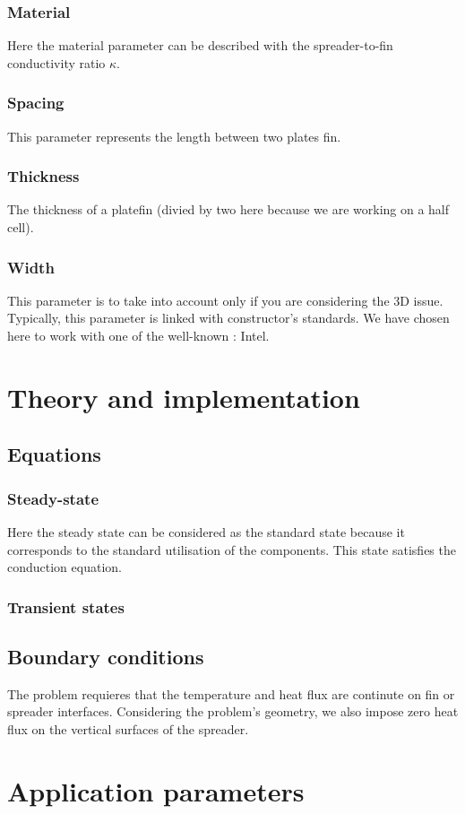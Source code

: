 \subsubsection{Material}

Here the material parameter can be described with the spreader-to-fin conductivity ratio $\kappa$.

\subsubsection{Spacing}
This parameter represents the length between two plates fin.

\subsubsection{Thickness}
The thickness of a platefin (divied by two here because we are working on a half cell).

\subsubsection{Width}

This parameter is to take into account only if you are considering the 3D issue. Typically, this parameter is linked with constructor's standards. We have chosen here to work with one of the well-known : Intel. 


\section{Theory and implementation}
\subsection{Equations}

\subsubsection{Steady-state}
Here the steady state can be considered as the standard state because it corresponds to the standard utilisation of the components. This state satisfies the conduction equation.

\subsubsection{Transient states}


\subsection{Boundary conditions}
The problem requieres that the temperature and heat flux are continute on fin or spreader interfaces. Considering the problem's geometry, we also impose zero heat flux on the vertical surfaces of the spreader. 

\section{Application parameters}
\label{therm:param}


